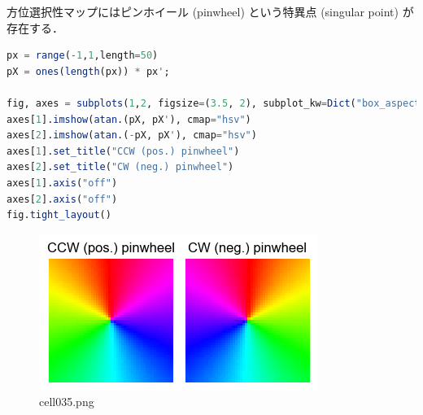 方位選択性マップにはピンホイール (pinwheel) という特異点 (singular point) が存在する．
\begin{lstlisting}[language=julia]
px = range(-1,1,length=50)
pX = ones(length(px)) * px';

fig, axes = subplots(1,2, figsize=(3.5, 2), subplot_kw=Dict("box_aspect"=>1))
axes[1].imshow(atan.(pX, pX'), cmap="hsv")
axes[2].imshow(atan.(-pX, pX'), cmap="hsv")
axes[1].set_title("CCW (pos.) pinwheel")
axes[2].set_title("CW (neg.) pinwheel")
axes[1].axis("off")
axes[2].axis("off")
fig.tight_layout()
\end{lstlisting}
\begin{figure}[ht]
	\centering
	\includegraphics[scale=0.8, max width=\linewidth]{./fig/local-learning-rule/self-organizing-map/cell035.png}
	\caption{cell035.png}
	\label{cell035.png}
\end{figure}
